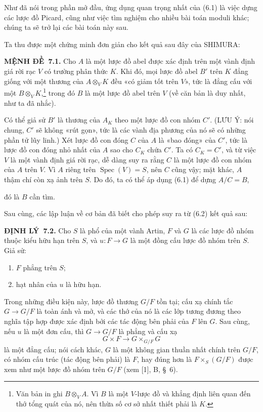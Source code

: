 \documentclass[11pt,twoside,openany]{book}
\numberwithin{equation}{section}
\newcommand{\src}[1]{%
  \phantomsection\hypertarget{src:\fgasourceid:#1}{}%
  \marginpar{\raggedleft\footnotesize\sffamily #1}%
}
\newcommand{\fgasourceid}{unset}
\newcommand{\result}[2]{\par\medskip\noindent\textbf{#1\if\relax\detokenize{#2}\relax\else\ #2\fi.}\quad}
\begin{document}
Như đã nói trong phần mở đầu, ứng dụng quan trọng nhất của (6.1) là việc dựng
các lược đồ Picard, cũng như việc tìm nghiệm cho nhiều bài toán moduli khác;
chúng ta sẽ trở lại các bài toán này sau.

Ta thu được một chứng minh đơn giản cho kết quả sau đây của SHIMURA:

\result{MỆNH ĐỀ}{7.1} Cho $A$ là một lược đồ abel được xác định trên một vành
định giá rời rạc $V$ có trường phân thức $K$. Khi đó, mọi lược đồ abel $B'$
trên $K$ đẳng giống với một thương của $A\otimes_V K$ đều «có giảm tốt trên
$V$», tức là đẳng cấu với một $B\otimes_V K$,\footnote{Văn bản in ghi
$B\otimes_V A$. Vì $B$ là một $V$-lược đồ và khẳng định liên quan đến thớ
tổng quát của nó, nên thừa số cơ sở nhất thiết phải là $K$.} trong đó $B$ là
một lược đồ abel trên $V$ (về căn bản là duy nhất, như ta đã nhắc).

Có thể giả sử $B'$ là thương của $A_K$ theo một lược đồ con nhóm $C'$.
(LƯU Ý: nói chung, $C'$ sẽ không «rút gọn», tức là các vành địa phương của nó
sẽ có những phần tử lũy linh.) Xét lược đồ con đóng $C$ của $A$ là «bao đóng»
của $C'$, tức là lược đồ con đóng nhỏ nhất của $A$ sao cho $C_K$ chứa $C'$.
Ta có $C_K=C'$, và từ việc $V$ là một vành định giá rời rạc, dễ dàng suy ra
rằng $C$ là một lược đồ con nhóm của $A$ trên $V$. Vì $A$ riêng trên
$\operatorname{Spec}(V)=S$, nên $C$ cũng vậy; mặt khác, $A$ thậm chí còn xạ
ảnh trên $S$. Do đó, ta có thể áp dụng (6.1) để dựng $A/C=B$,
\src{115}
đó là $B$ cần tìm.

Sau cùng, các lập luận về cơ bản đã biết cho phép suy ra từ (6.2) kết quả sau:

\result{ĐỊNH LÝ}{7.2} Cho $S$ là phổ của một vành Artin, $F$ và $G$ là các
lược đồ nhóm thuộc kiểu hữu hạn trên $S$, và $u:F\to G$ là một đồng cấu lược
đồ nhóm trên $S$. Giả sử:
\begin{enumerate}
\item[(i)] $F$ phẳng trên $S$;
\item[(ii)] hạt nhân của $u$ là hữu hạn.
\end{enumerate}
Trong những điều kiện này, lược đồ thương $G/F$ tồn tại; cấu xạ chính tắc
$G\to G/F$ là toàn ánh và mở, và các thớ của nó là các lớp tương đương theo
nghĩa tập hợp được xác định bởi các tác động bên phải của $F$ lên $G$. Sau
cùng, nếu $u$ là một đơn cấu, thì $G\to G/F$ là phẳng và cấu xạ
\[
  G\times F\longrightarrow G\times_{G/F}G
\]
là một đẳng cấu; nói cách khác, $G$ là một không gian thuần nhất chính trên
$G/F$, có nhóm cấu trúc (tác động bên phải) là $F$, hay đúng hơn là
$F\times_S(G/F)$ được xem như một lược đồ nhóm trên $G/F$ (xem [1], B,
\S~6).
\end{document}
